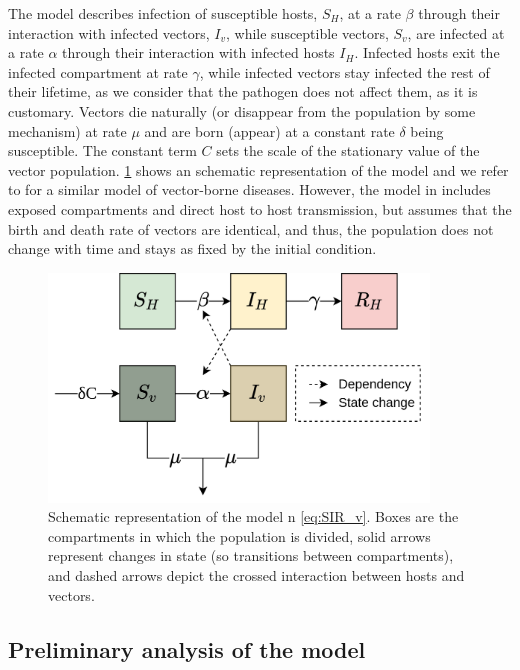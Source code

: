 The model describes infection of susceptible hosts, $S_H$, at a rate
$\beta$ through their interaction with infected vectors, $I_v$, while
susceptible vectors, $S_v$, are infected at a rate $\alpha$ through their
interaction with infected hosts $I_H$. Infected hosts exit the infected
compartment at rate $\gamma$, while infected vectors stay infected the rest of
their lifetime, as we consider that the pathogen does not affect them, as it is
customary. Vectors die naturally (or disappear from the population by some
mechanism) at rate $\mu$ and are born (appear) at a constant rate $\delta$
being susceptible. The constant term $C$ sets the scale of the stationary value
of the vector population. \cref{fig:model_diagram} shows an schematic
representation of the model and we refer to \cite{Brauer2016} for a similar
model of vector-borne diseases. However, the model in \cite{Brauer2016}
includes exposed compartments and direct host to host transmission, but assumes
that the birth and death rate of vectors are identical, and thus, the
population does not change with time and stays as fixed by the initial
condition.
\begin{figure}[H]
    \centering
    \includegraphics[width=0.9\textwidth]{Figures/Diagram.png}
    \caption{Schematic representation of the model n \cref{eq:SIR_v}. Boxes
        are the compartments in which the population is divided, solid arrows
        represent
        changes in state (so transitions between compartments), and dashed
        arrows
        depict the crossed interaction between hosts and vectors.}
    \label{fig:model_diagram}
\end{figure}

\subsection{Preliminary analysis of the model} \label{sec:Prelimanalysis}

